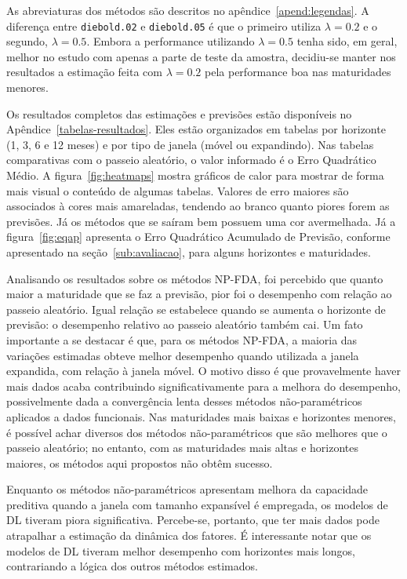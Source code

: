 \documentclass[
	12pt,				%
	openright,			%
	oneside,			%
	a4paper,			%
	english,			%
	brazil				%
	]{dissertacao-ufrgs-abntex2}
\begin{document}
As abreviaturas dos métodos são descritos no apêndice~\ref{apend:legendas}. A diferença entre \texttt{diebold.02} e \texttt{diebold.05} é que o primeiro utiliza $\lambda=0.2$ e o segundo, $\lambda=0.5$. Embora a performance utilizando $\lambda=0.5$ tenha sido, em geral, melhor no estudo com apenas a parte de teste da amostra, decidiu-se manter nos resultados a estimação feita com $\lambda=0.2$ pela performance boa nas maturidades menores.

Os resultados completos das estimações e previsões estão disponíveis no Apêndice~\ref{tabelas-resultados}. Eles estão organizados em tabelas por horizonte (1, 3, 6 e 12 meses) e por tipo de janela (móvel ou expandindo). Nas tabelas comparativas com o passeio aleatório, o valor informado é o Erro Quadrático Médio. A figura~\ref{fig:heatmaps} mostra gráficos de calor para mostrar de forma mais visual o conteúdo de algumas tabelas. Valores de erro maiores são associados à cores mais amareladas, tendendo ao branco quanto piores forem as previsões. Já os métodos que se saíram bem possuem uma cor avermelhada. Já a figura~\ref{fig:eqap} apresenta o Erro Quadrático Acumulado de Previsão, conforme apresentado na seção~\ref{sub:avaliacao}, para alguns horizontes e maturidades.

Analisando os resultados sobre os métodos NP-FDA, foi percebido que quanto maior a maturidade que se faz a previsão, pior foi o desempenho com relação ao passeio aleatório. Igual relação se estabelece quando se aumenta o horizonte de previsão: o desempenho relativo ao passeio aleatório também cai. Um fato importante a se destacar é que, para os métodos NP-FDA, a maioria das variações estimadas obteve melhor desempenho quando utilizada a janela expandida, com relação à janela móvel. O motivo disso é que provavelmente haver mais dados acaba contribuindo significativamente para a melhora do desempenho, possivelmente dada a convergência lenta desses métodos não-paramétricos aplicados a dados funcionais. 
Nas maturidades mais baixas e horizontes menores, é possível achar diversos dos métodos não-paramétricos que são melhores que o passeio aleatório; no entanto, com as maturidades mais altas e horizontes maiores, os métodos aqui propostos não obtêm sucesso.

Enquanto os métodos não-paramétricos apresentam melhora da capacidade preditiva quando a janela com tamanho expansível é empregada, os modelos de DL tiveram piora significativa. Percebe-se, portanto, que ter mais dados pode atrapalhar a estimação da dinâmica dos fatores. É interessante notar que os modelos de DL tiveram melhor desempenho com horizontes mais longos, contrariando a lógica dos outros métodos estimados.
\end{document}
